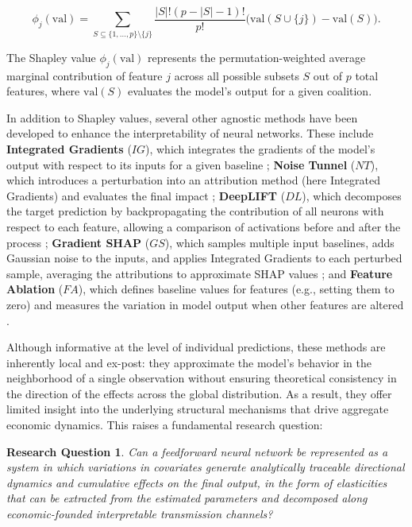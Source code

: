 \documentclass[preprint,12pt,authoryear]{sn-jnl}
\newtheorem{research}{Research Question}
\begin{document}
\begin{equation}
\phi_j(\text{val}) = \sum_{S \subseteq \{1,\dots,p\}\setminus\{j\}} 
\frac{|S|!(p-|S|-1)!}{p!} \Big(\text{val}(S \cup \{j\}) - \text{val}(S)\Big).
\end{equation}

The Shapley value $\phi_j(\text{val})$ represents the permutation-weighted average marginal contribution of feature $j$ across all possible subsets $S$ out of $p$ total features, where $\text{val}(S)$ evaluates the model's output for a given coalition.

In addition to Shapley values, several other agnostic methods have been developed to enhance the interpretability of neural networks. These include \textbf{Integrated Gradients} ($IG$), which integrates the gradients of the model’s output with respect to its inputs for a given baseline \citep{sundararajan2017axiomatic}; \textbf{Noise Tunnel} ($NT$), which introduces a perturbation into an attribution method (here Integrated Gradients) and evaluates the final impact \citep{smilkov2017smoothgrad}; \textbf{DeepLIFT} ($DL$), which decomposes the target prediction by backpropagating the contribution of all neurons with respect to each feature, allowing a comparison of activations before and after the process \citep{shrikumar2017learning}; \textbf{Gradient SHAP} ($GS$), which samples multiple input baselines, adds Gaussian noise to the inputs, and applies Integrated Gradients to each perturbed sample, averaging the attributions to approximate SHAP values \citep{kokhlikyan2020captum}; and \textbf{Feature Ablation} ($FA$), which defines baseline values for features (e.g., setting them to zero) and measures the variation in model output when other features are altered \citep{molnar2020interpretable}.

Although informative at the level of individual predictions, these methods are inherently local and ex-post: they approximate the model's behavior in the neighborhood of a single observation without ensuring theoretical consistency in the direction of the effects across the global distribution. As a result, they offer limited insight into the underlying structural mechanisms that drive aggregate economic dynamics. This raises a fundamental research question:

\begin{research} \label{research_question}
    \textit{Can a feedforward neural network be represented as a system in which variations in covariates generate analytically traceable directional dynamics and cumulative effects on the final output, in the form of elasticities that can be extracted from the estimated parameters and decomposed along economic-founded interpretable transmission channels}?
\end{research}
\end{document}
